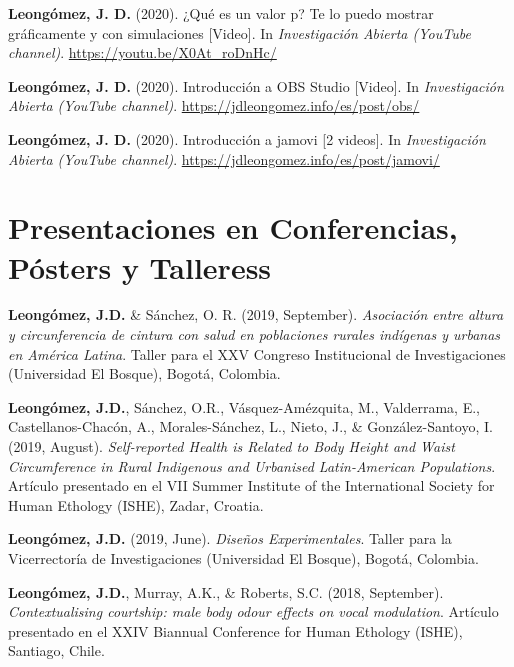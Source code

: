 \documentclass[11pt, a4paper]{awesome-cv}
\begin{document}
\leavevmode\hypertarget{ref-leongomezValorP2020}{}%
\textbf{Leongómez, J. D.} (2020). ¿Qué es un valor p? Te lo puedo mostrar gráficamente y con simulaciones {[}Video{]}. In \emph{Investigación Abierta (YouTube channel)}. \url{https://youtu.be/X0At_roDnHc/}

\leavevmode\hypertarget{ref-leongomezIntroduccionOBSStudio2020}{}%
\textbf{Leongómez, J. D.} (2020). Introducción a OBS Studio {[}Video{]}. In \emph{Investigación Abierta (YouTube channel)}. \url{https://jdleongomez.info/es/post/obs/}

\leavevmode\hypertarget{ref-leongomezIntroduccionJamovi2020}{}%
\textbf{Leongómez, J. D.} (2020). Introducción a jamovi {[}2 videos{]}. In \emph{Investigación Abierta (YouTube channel)}. \url{https://jdleongomez.info/es/post/jamovi/}

\endgroup

\hypertarget{presentaciones-en-conferencias-puxf3sters-y-talleress}{%
\section{Presentaciones en Conferencias, Pósters y Talleress}\label{presentaciones-en-conferencias-puxf3sters-y-talleress}}

\begingroup
\setlength{\parindent}{-0.5in}
\setlength{\leftskip}{0.5in}

\textbf{Leongómez, J.D.} \& Sánchez, O. R. (2019, September). \emph{Asociación entre altura y circunferencia de cintura con salud en poblaciones rurales indígenas y urbanas en América Latina}. Taller para el XXV Congreso Institucional de Investigaciones (Universidad El Bosque), Bogotá, Colombia.

\textbf{Leongómez, J.D.}, Sánchez, O.R., Vásquez-Amézquita, M., Valderrama, E., Castellanos-Chacón, A., Morales-Sánchez, L., Nieto, J., \& González-Santoyo, I. (2019, August). \emph{Self-reported Health is Related to Body Height and Waist Circumference in Rural Indigenous and Urbanised Latin-American Populations}. Artículo presentado en el VII Summer Institute of the International Society for Human Ethology (ISHE), Zadar, Croatia.

\textbf{Leongómez, J.D.} (2019, June). \emph{Diseños Experimentales}. Taller para la Vicerrectoría de Investigaciones (Universidad El Bosque), Bogotá, Colombia.

\textbf{Leongómez, J.D.}, Murray, A.K., \& Roberts, S.C. (2018, September). \emph{Contextualising courtship: male body odour effects on vocal modulation}. Artículo presentado en el XXIV Biannual Conference for Human Ethology (ISHE), Santiago, Chile.
\end{document}
